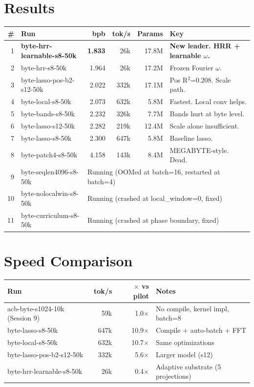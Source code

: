 \documentclass[11pt,a4paper]{report}
\begin{document}
\section{Results}

\begin{center}
\begin{tabular}{rlrrrl}
\toprule
\# & Run & bpb & tok/s & Params & Key \\
\midrule
1 & \textbf{byte-hrr-learnable-s8-50k} & \textbf{1.833} & 26k & 17.8M & \textbf{New leader. HRR + learnable $\omega$.} \\
2 & byte-hrr-s8-50k & 1.964 & 26k & 17.2M & Frozen Fourier $\omega$. \\
3 & byte-lasso-pos-b2-s12-50k & 2.022 & 332k & 17.1M & Pos R$^2$=0.208. Scale path. \\
4 & byte-local-s8-50k & 2.073 & 632k & 5.8M & Fastest. Local conv helps. \\
5 & byte-bands-s8-50k & 2.232 & 326k & 7.7M & Bands hurt at byte level. \\
6 & byte-lasso-s12-50k & 2.282 & 219k & 12.4M & Scale alone insufficient. \\
7 & byte-lasso-s8-50k & 2.300 & 647k & 5.8M & Baseline lasso. \\
8 & byte-patch4-s8-50k & 4.158 & 143k & 8.4M & MEGABYTE-style. Dead. \\
\midrule
9 & byte-seqlen4096-s8-50k & \multicolumn{4}{l}{Running (OOMed at batch=16, restarted at batch=4)} \\
10 & byte-nolocalwin-s8-50k & \multicolumn{4}{l}{Running (crashed at local\_window=0, fixed)} \\
11 & byte-curriculum-s8-50k & \multicolumn{4}{l}{Running (crashed at phase boundary, fixed)} \\
\bottomrule
\end{tabular}
\end{center}

\section{Speed Comparison}

\begin{center}
\begin{tabular}{lrrl}
\toprule
Run & tok/s & $\times$ vs pilot & Notes \\
\midrule
acb-byte-s1024-10k (Session 9) & 59k & 1.0$\times$ & No compile, kernel impl, batch=8 \\
byte-lasso-s8-50k & 647k & 10.9$\times$ & Compile + auto-batch + FFT \\
byte-local-s8-50k & 632k & 10.7$\times$ & Same optimizations \\
byte-lasso-pos-b2-s12-50k & 332k & 5.6$\times$ & Larger model (s12) \\
byte-hrr-learnable-s8-50k & 26k & 0.4$\times$ & Adaptive substrate (5 projections) \\
\bottomrule
\end{tabular}
\end{center}
\end{document}

